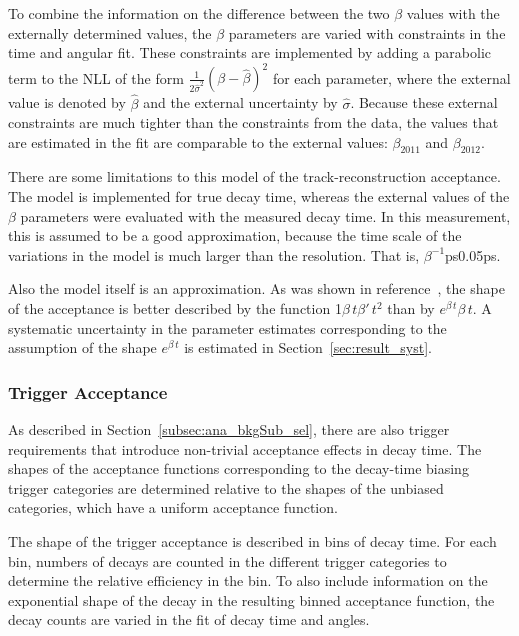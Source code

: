 To combine the information on the difference between the two $\beta$ values with the externally determined values, the $\beta$ parameters
are varied with constraints in the time and angular fit. These constraints are implemented by adding a parabolic term to the NLL of the
form $\frac{1}{2\hat{\sigma}^2}(\beta-\hat{\beta})^2$ for each parameter, where the external value is denoted by $\hat{\beta}$ and the
external uncertainty by $\hat{\sigma}$. Because these external constraints are much tighter than the constraints from the \BstoJpsiKK{}
data, the values that are estimated in the fit are comparable to the external values:
$\beta_\text{2011}$\texteq\mbox{\unitsp\invps} and
$\beta_\text{2012}$\texteq\mbox{\unitsp\invps}.

There are some limitations to this model of the track-reconstruction acceptance. The model is implemented for true decay time, whereas the
external values of the $\beta$ parameters were evaluated with the measured decay time. In this measurement, this is assumed to be a good
approximation, because the time scale of the variations in the model is much larger than the resolution. That is,
$\beta^{-1}$\textapprox\mbox{\unitsp{}ps}\textgg\mbox{0.05\unitsp{}ps}.

Also the model itself is an approximation. As was shown in reference~\cite{LHCb-ANA-2014-039}, the shape of the acceptance is better
described by the function 1\textplus$\beta\,t$\textplus$\beta'\,t^2$ than by $e^{\beta\,t}$\textplus$\beta\,t$. A systematic
uncertainty in the parameter estimates corresponding to the assumption of the shape $e^{\beta\,t}$ is estimated in
Section~\ref{sec:result_syst}.

\subsubsection{Trigger Acceptance}
As described in Section~\ref{subsec:ana_bkgSub_sel}, there are also trigger requirements that introduce non-trivial acceptance effects in
decay time. The shapes of the acceptance functions corresponding to the decay-time biasing trigger categories are determined relative to
the shapes of the unbiased categories, which have a uniform acceptance function.

The shape of the trigger acceptance is described in bins of decay time. For each bin, numbers of decays are counted in the different
trigger categories to determine the relative efficiency in the bin. To also include information on the exponential shape of the decay in
the resulting binned acceptance function, the decay counts are varied in the fit of decay time and angles.


